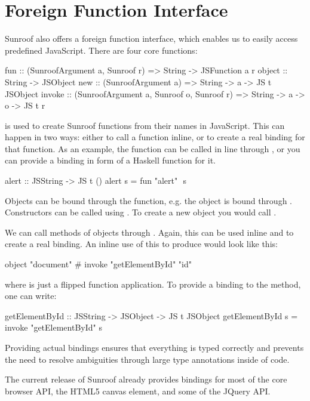  
\section{Foreign Function Interface}
\label{sec:ffi}

Sunroof also offers a 
foreign function interface, which enables us to easily 
access predefined JavaScript. There are four core functions:
\begin{Code}
fun    :: (SunroofArgument a, Sunroof r) 
       => String -> JSFunction a r
object :: String -> JSObject
new    :: (SunroofArgument a) 
       => String -> a -> JS t JSObject
invoke :: (SunroofArgument a, Sunroof o, Sunroof r) 
       => String -> a -> o -> JS t r
\end{Code}
 is used to create Sunroof functions from their names in JavaScript.
This can happen in two ways: either to call a function inline, or to 
create a real binding for that function. As an example, 
the  function can be called in line through ,
or you can provide a binding in form of a Haskell function for it.
\begin{Code}
alert :: JSString -> JS t ()
alert s = fun "alert" $$ s
\end{Code}

Objects can be bound through the  function, e.g.
the  object is bound through .
Constructors can be called using . To create a new
object you would call .

We can call methods of objects through . Again, this 
can be used inline and to create a real binding. An inline 
use of this to produce  would look like this: 
\begin{Code}
object "document" # invoke "getElementById" "id"
\end{Code}
where \Src{\#} is just a flipped function application. To provide a binding 
to the  method, one can write:
\begin{Code}
getElementById :: JSString -> JSObject -> JS t JSObject
getElementById s = invoke "getElementById" s
\end{Code}

Providing actual bindings ensures that
everything is typed correctly and prevents the need to resolve ambiguities 
through large type annotations inside of code.

The current release of Sunroof already provides bindings for most of the 
core browser API, the HTML5 canvas element, and some of the JQuery API.

